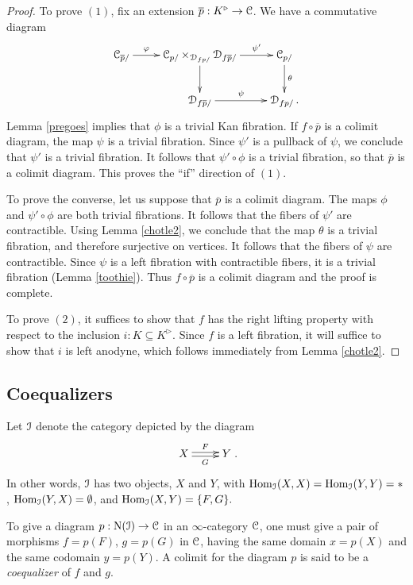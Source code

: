 \begin{proof}
To prove $(1)$, fix an extension $\overline{p}: K^{\triangleright} \rightarrow \operatorname{\mathcal{C}}$. 
We have a commutative diagram
$$ \xymatrix{ \calC_{\overline{p}/} \ar[r]^-{\phi} & \calC_{p/} \times_{\calD_{fp/}} \calD_{f\overline{p}/} \ar[r]^-{\psi'} \ar[d] & \calC_{p/} \ar[d]^{\theta} \\
& \calD_{f \overline{p}/} \ar[r]^-{\psi} & \calD_{fp/}. }$$
Lemma \ref{pregoes} implies that $\phi$ is a trivial Kan fibration.
If $f \circ \overline{p}$ is a colimit diagram, the map $\psi$ is a trivial fibration. Since $\psi'$ is a pullback of $\psi$, we conclude that $\psi'$ is a trivial fibration. It follows that $\psi' \circ \phi$ is a trivial fibration, so that $\overline{p}$ is a colimit diagram. This proves the ``if'' direction of $(1)$.

To prove the converse, let us suppose that $\overline{p}$ is a colimit diagram. The maps
$\phi$ and $\psi' \circ \phi$ are both trivial fibrations. It follows that the fibers of $\psi'$ are contractible. Using Lemma \ref{chotle2}, we conclude that the map $\theta$ is a trivial fibration, and therefore surjective on vertices. It follows that the fibers of $\psi$ are contractible. Since $\psi$ is a left fibration with contractible fibers, it is a trivial fibration (Lemma \ref{toothie}). Thus $f \circ \overline{p}$ is a colimit diagram and the proof is complete.

To prove $(2)$, it suffices to show that $f$ has the right lifting property with respect to the inclusion
$i: K \subseteq K^{\triangleright}$. Since $f$ is a left fibration, it will suffice to show that $i$ is left anodyne, which follows immediately from Lemma \ref{chotle2}.
\end{proof}

\subsection{Coequalizers}\label{quasilimit8}

Let $\operatorname{\mathcal{I}}$ denote the category depicted by the diagram
$$\xymatrix{ X \ar@<.4ex>[r]^{F} \ar@<-.4ex>[r]_{G} & Y}.$$
In other words, $\operatorname{\mathcal{I}}$ has two objects, $X$ and $Y$, with
$ \operatorname{Hom}_{\operatorname{\mathcal{I}}}(X,X) = \operatorname{Hom}_{\operatorname{\mathcal{I}}}(Y,Y) = \ast$, $ \operatorname{Hom}_{\operatorname{\mathcal{I}}}(Y,X) = \emptyset$, and
$ \operatorname{Hom}_{\operatorname{\mathcal{I}}}(X,Y) = \{ F,G \}.$

To give a diagram $p: \operatorname{N}(\operatorname{\mathcal{I}}) \rightarrow \operatorname{\mathcal{C}}$ in an $\infty$-category $\operatorname{\mathcal{C}}$, one must give a pair of morphisms $f = p(F)$, $g = p(G)$ in $\operatorname{\mathcal{C}}$, having the same domain $x=p(X)$ and the same codomain $y = p(Y)$. A colimit for the diagram $p$ is said to be a {\em coequalizer} of $f$ and $g$.

